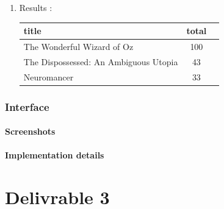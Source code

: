 \documentclass[doubleside, titlepage]{article}
\begin{document}
\begin{enumerate}
\begin{enumerate}
	\item Results :\\
	
	\begin{tabular}{|l|c|r|}
	  \hline
		title & total\\
	  \hline	
		The Wonderful Wizard of Oz	& 100\\
		The Dispossessed: An Ambiguous Utopia	& 43\\
		Neuromancer	& 33\\
	  \hline
	\end{tabular}
\end{enumerate}

\end{enumerate}

\section{Interface}

\subsection{Screenshots}

\subsection{Implementation details}

\newpage
\part{Delivrable 3}
\end{document}
